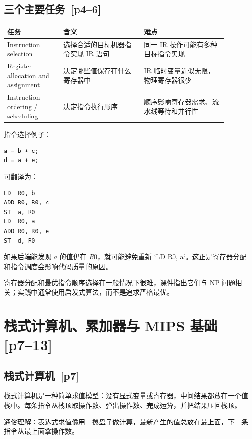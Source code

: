 \documentclass[UTF8,fontset=none,11pt]{ctexart}
\newenvironment{defbox}[1][]{%
  \par\medskip\noindent{\color{defrule}\rule{\linewidth}{1.1pt}}\par\nopagebreak
  \noindent{\bfseries\color{defrule}#1}\par\nopagebreak\smallskip}%
  {\par\nopagebreak\smallskip\noindent{\color{defrule}\rule{\linewidth}{0.4pt}}\par\medskip}
\newcommand{\pg}[1]{\texorpdfstring{{\small\color{graytext}\,[p#1]}}{ [p#1]}}
\begin{document}
\subsection{三个主要任务 \pg{4--6}}

\begin{longtable}{L{0.23\linewidth}L{0.33\linewidth}L{0.34\linewidth}}
\toprule
任务 & 含义 & 难点 \\
\midrule
Instruction selection & 选择合适的目标机器指令实现 IR 语句 & 同一 IR 操作可能有多种目标指令实现 \\
Register allocation and assignment & 决定哪些值保存在什么寄存器中 & IR 临时变量近似无限，物理寄存器很少 \\
Instruction ordering / scheduling & 决定指令执行顺序 & 顺序影响寄存器需求、流水线等待和并行性 \\
\bottomrule
\end{longtable}

指令选择例子：

\begin{verbatim}
a = b + c;
d = a + e;
\end{verbatim}

可翻译为：

\begin{verbatim}
LD  R0, b
ADD R0, R0, c
ST  a, R0
LD  R0, a
ADD R0, R0, e
ST  d, R0
\end{verbatim}

如果后端能发现 \(a\) 的值仍在 \(R0\)，就可能避免重新 `LD R0, a`。这正是寄存器分配和指令调度会影响代码质量的原因。

寄存器分配和最优指令顺序选择在一般情况下很难，课件指出它们与 NP 问题相关；实践中通常使用启发式算法，而不是追求严格最优。

\section{栈式计算机、累加器与 MIPS 基础 \pg{7--13}}

\subsection{栈式计算机 \pg{7}}

\begin{defbox}[Stack Machine]
栈式计算机是一种简单求值模型：没有显式变量或寄存器，中间结果都放在一个值栈中。每条指令从栈顶取操作数、弹出操作数、完成运算，并把结果压回栈顶。
\end{defbox}

通俗理解：表达式求值像用一摞盘子做计算，最新产生的值总放在最上面，下一条指令从最上面拿操作数。
\end{document}
